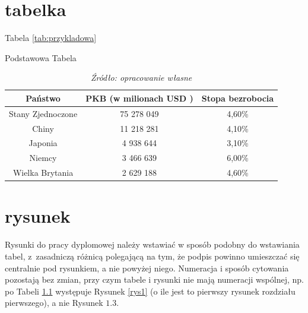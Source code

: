 \documentclass[inzynierska]{pwr_wmat_praca_dyplomowa}
\theoremstyle{plain}
\numberwithin{theorem}{chapter}
\theoremstyle{definition}
\numberwithin{theorem}{chapter}
\begin{document}
\chapter{tabelka}
Tabela \ref{tab:przykladowa} 
\begin{table}[H]
	\caption{Podstawowa Tabela}
	\centering
	\begin{tabular}{ccc}
		\hline
		\hline                       
		Państwo & PKB (w milionach USD )& Stopa bezrobocia  \\  [0.5ex] 
		\hline 
		Stany Zjednoczone & 75 278 049 & 4,60\%  \\
		Chiny & 11 218 281 & 4,10\%   \\
		Japonia & 4 938 644 & 3,10\%  \\
		Niemcy & 3 466 639 & 6,00\%   \\
		Wielka Brytania & 2 629 188 & 4,60\%  \\ [1ex]  
		\hline 
	\end{tabular}
	\caption*{\textit{Źródło: opracowanie własne}}
	\label{tab:przykladowa2} 
\end{table}
\chapter{rysunek}
Rysunki do pracy dyplomowej należy wstawiać w sposób podobny do wstawiania tabel, z~zasadniczą różnicą polegającą na tym, że podpis powinno umieszczać się centralnie pod rysunkiem, a nie powyżej niego. Numeracja i sposób cytowania pozostają bez zmian, przy czym tabele i rysunki nie mają numeracji wspólnej, np. po Tabeli \ref{tab:przykladowa2} występuje Rysunek \ref{rys1} (o ile jest to pierwszy rysunek rozdziału pierwszego), a nie Rysunek $1.3$.
\end{document}
